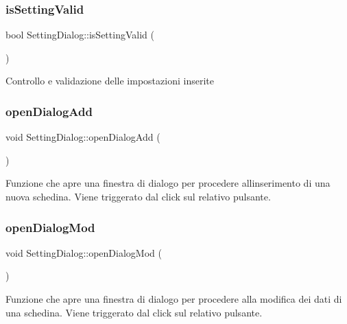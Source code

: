 \subsubsection{\texorpdfstring{is\+Setting\+Valid}{isSettingValid}}
{\footnotesize\ttfamily bool Setting\+Dialog\+::is\+Setting\+Valid (\begin{DoxyParamCaption}{ }\end{DoxyParamCaption})\hspace{0.3cm}{\ttfamily [slot]}}

Controllo e validazione delle impostazioni inserite \mbox{\label{class_setting_dialog_a0036c00515df69b40ae9427b943d09ce}} 
\subsubsection{\texorpdfstring{open\+Dialog\+Add}{openDialogAdd}}
{\footnotesize\ttfamily void Setting\+Dialog\+::open\+Dialog\+Add (\begin{DoxyParamCaption}{ }\end{DoxyParamCaption})\hspace{0.3cm}{\ttfamily [slot]}}

Funzione che apre una finestra di dialogo per procedere all\textquotesingle{}inserimento di una nuova schedina. Viene triggerato dal click sul relativo pulsante. \mbox{\label{class_setting_dialog_a88c1e32d44b349f50792097f74a58364}} 
\subsubsection{\texorpdfstring{open\+Dialog\+Mod}{openDialogMod}}
{\footnotesize\ttfamily void Setting\+Dialog\+::open\+Dialog\+Mod (\begin{DoxyParamCaption}{ }\end{DoxyParamCaption})\hspace{0.3cm}{\ttfamily [slot]}}

Funzione che apre una finestra di dialogo per procedere alla modifica dei dati di una schedina. Viene triggerato dal click sul relativo pulsante. \mbox{\label{class_setting_dialog_a9d5263cf6d408810b96a08774c68b91e}} 
